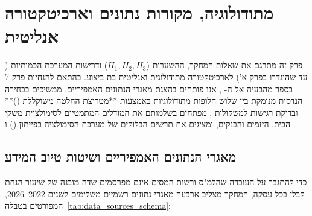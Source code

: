 
\chapter{מתודולוגיה, מקורות נתונים וארכיטקטורה אנליטית}
\label{ch:methodology}

פרק זה מתרגם את שאלות המחקר, ההשערות ($H_1, H_2, H_3$) ודרישות המערכת הכמותיות ( עד  שהוגדרו בפרק א') לארכיטקטורה מתודולוגית ואנליטית בת-ביצוע. בהתאם להנחיות פרק \num{7} בספר מהבעיה אל ה- \cite{segal2026prep}, אנו פותחים בהצגת מאגרי הנתונים האמפיריים, ממשיכים בבחירה הנדסית מנומקת בין שלוש חלופות מתודולוגיות באמצעות **מטריצת החלטה משוקללת ()** ובדיקת רגישות למשקולות \cite{pugh1991total,segal2026prep}, מפתחים בשלמותם את המודלים המתמטיים לסימולציית משקי הבית, היזמים והבנקים, ומציגים את תרשים הבלוקים של מערכת הסימולציה בפייתון () ו-.

\section{מאגרי הנתונים האמפיריים ושיטות טיוב המידע}
\label{sec:data_sources}

כדי להתגבר על העובדה שהלמ"ס ורשות המסים אינם מפרסמים שדה מובנה של שיעור הנחת קבלן בכל עסקה, המחקר מצליב ארבעה מאגרי נתונים רשמיים משלימים לשנים \num{2022}--\num{2026}, המפורטים בטבלה~\ref{tab:data_sources_schema}:

